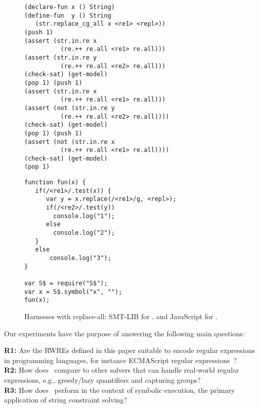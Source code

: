 \begin{figure}[tb]
  \scriptsize

  \begin{minipage}{0.49\linewidth}
\begin{verbatim}
(declare-fun x () String)
(define-fun  y () String
   (str.replace_cg_all x <re1> <repl>))
(push 1)
(assert (str.in.re x 
          (re.++ re.all <re1> re.all)))
(assert (str.in.re y 
          (re.++ re.all <re2> re.all)))
(check-sat) (get-model)
(pop 1) (push 1)
(assert (str.in.re x 
          (re.++ re.all <re1> re.all)))
(assert (not (str.in.re y 
          (re.++ re.all <re2> re.all))))
(check-sat) (get-model)
(pop 1) (push 1)
(assert (not (str.in.re x 
          (re.++ re.all <re1> re.all))))
(check-sat) (get-model)
(pop 1)
\end{verbatim}
  \end{minipage}\hfill
  \raisebox{-25ex}{\rule{0.4pt}{52ex}}\hfill
  \begin{minipage}{0.49\linewidth}
\begin{verbatim}
function fun(x) {
   if(/<re1>/.test(x)) {
      var y = x.replace(/<re1>/g, <repl>);
      if(/<re2>/.test(y))
        console.log("1");
      else
        console.log("2");
   }
   else
       console.log("3");
}

var S$ = require("S$");
var x = S$.symbol("x", "");
fun(x);
\end{verbatim}
  \end{minipage}
  
  \caption{Harnesses with replace-all: SMT-LIB for \ostrich,
    and JavaScript for \expose{}.}
  \label{fig:harness}
  \vspace{-4mm}
\end{figure}

Our experiments have the purpose of answering the following main questions:

\medskip
\noindent
\textbf{R1:} Are the  RWREs defined in this paper
suitable to encode regular expressions in programming languages,
for instance ECMAScript regular expressions~\cite{ECMAScript11}?
\\
\textbf{R2:} How does \ostrich\ compare to other solvers that can
handle real-world regular expressions, e.g., greedy/lazy
quantifiers and capturing groups?
\\
\textbf{R3:} How does \ostrich\ perform in the context of symbolic execution,
the primary application of string constraint solving?

\vspace{-2mm}

